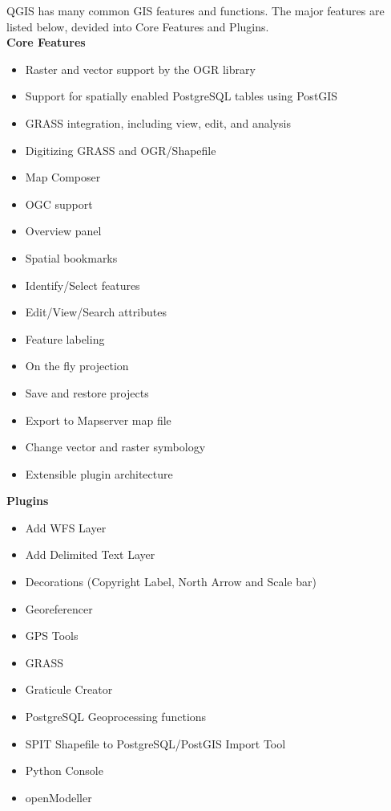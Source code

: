 QGIS has many common GIS features and functions. The major features
are listed below, devided into Core Features and Plugins. \\

\textbf{Core Features}

\begin{itemize}
\item Raster and vector support by the OGR library
\item Support for spatially enabled PostgreSQL tables using PostGIS
\item GRASS integration, including view, edit, and analysis
\item Digitizing GRASS and OGR/Shapefile
\item Map Composer
\item OGC support
\item Overview panel
\item Spatial bookmarks
\item Identify/Select features
\item Edit/View/Search attributes
\item Feature labeling
\item On the fly projection
\item Save and restore projects
\item Export to Mapserver map file
\item Change vector and raster symbology 
\item Extensible plugin architecture
\end{itemize}

\textbf{Plugins}

\begin{itemize}
\item Add WFS Layer
\item Add Delimited Text Layer
\item Decorations (Copyright Label, North Arrow and Scale bar)
\item Georeferencer
\item GPS Tools
\item GRASS
\item Graticule Creator
\item PostgreSQL Geoprocessing functions
\item SPIT Shapefile to PostgreSQL/PostGIS Import Tool
\item Python Console
\item openModeller
\end{itemize}

